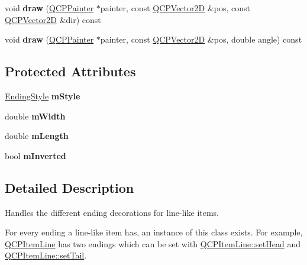 \begin{DoxyCompactItemize}
\item 
\mbox{\label{classQCPLineEnding_a4f45db54f2aba03acf055e29aec1e8e7}} 
void {\bfseries draw} (\hyperlink{classQCPPainter}{Q\+C\+P\+Painter} $\ast$painter, const \hyperlink{classQCPVector2D}{Q\+C\+P\+Vector2D} \&pos, const \hyperlink{classQCPVector2D}{Q\+C\+P\+Vector2D} \&dir) const
\item 
\mbox{\label{classQCPLineEnding_af7ac30a81ba85b9bded148c6ec387391}} 
void {\bfseries draw} (\hyperlink{classQCPPainter}{Q\+C\+P\+Painter} $\ast$painter, const \hyperlink{classQCPVector2D}{Q\+C\+P\+Vector2D} \&pos, double angle) const
\end{DoxyCompactItemize}
\subsection*{Protected Attributes}
\begin{DoxyCompactItemize}
\item 
\mbox{\label{classQCPLineEnding_a4696fc9117b60f1ca7690fcd2ba56611}} 
\hyperlink{classQCPLineEnding_a5ef16e6876b4b74959c7261d8d4c2cd5}{Ending\+Style} {\bfseries m\+Style}
\item 
\mbox{\label{classQCPLineEnding_aca89d21341133c20dc6825c33a5eac48}} 
double {\bfseries m\+Width}
\item 
\mbox{\label{classQCPLineEnding_ae8e1e2566b96c05736cd92662dba8af8}} 
double {\bfseries m\+Length}
\item 
\mbox{\label{classQCPLineEnding_a91306fe771d54c955e0af21af14349d5}} 
bool {\bfseries m\+Inverted}
\end{DoxyCompactItemize}


\subsection{Detailed Description}
Handles the different ending decorations for line-\/like items. 

 For every ending a line-\/like item has, an instance of this class exists. For example, \hyperlink{classQCPItemLine}{Q\+C\+P\+Item\+Line} has two endings which can be set with \hyperlink{classQCPItemLine_aebf3d687114d584e0459db6759e2c3c3}{Q\+C\+P\+Item\+Line\+::set\+Head} and \hyperlink{classQCPItemLine_ac264222c3297a7efe33df9345c811a5f}{Q\+C\+P\+Item\+Line\+::set\+Tail}.

